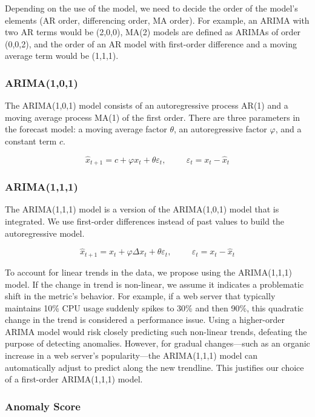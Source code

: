 \documentclass[pdflatex,sn-nature]{sn-jnl}%
\theoremstyle{thmstyleone}%
\theoremstyle{thmstyletwo}%
\theoremstyle{thmstylethree}%
\begin{document}
Depending on the use of the model, we need to decide the order of the model's elements (AR order, differencing order, MA order). For example, an ARIMA with two AR terms would be (2,0,0), MA(2) models are defined as ARIMAs of order (0,0,2), and the order of an AR model with first-order difference and a moving average term would be (1,1,1).

\subsubsection*{ARIMA(1,0,1)}\label{methodology: arima(1,0,1)}

The ARIMA(1,0,1) model consists of an autoregressive process AR(1) and a moving average process MA(1) of the first order. There are three parameters in the forecast model: a moving average factor $\theta$, an autoregressive factor $\varphi$, and a constant term $c$.


\[ \hat{x}_{t+1} = c + \varphi x_t + \theta\varepsilon_t, \hspace{1cm} \varepsilon_t = x_t-\hat{x}_t\]


\subsubsection*{ARIMA(1,1,1)}\label{methodology: arima(1,1,1)}


The ARIMA(1,1,1) model is a version of the ARIMA(1,0,1) model that is integrated. We use first-order differences instead of past values to build the autoregressive model.

\[ \hat{x}_{t+1} = x_t + \varphi\Delta x_t + \theta\varepsilon_t, \hspace{1cm} \varepsilon_t = x_t-\hat{x}_t\]

To account for linear trends in the data, we propose using the ARIMA(1,1,1) model. If the change in trend is non-linear, we assume it indicates a problematic shift in the metric's behavior. For example, if a web server that typically maintains 10\% CPU usage suddenly spikes to 30\% and then 90\%, this quadratic change in the trend is considered a performance issue. Using a higher-order ARIMA model would risk closely predicting such non-linear trends, defeating the purpose of detecting anomalies. However, for gradual changes—such as an organic increase in a web server's popularity—the ARIMA(1,1,1) model can automatically adjust to predict along the new trendline. This justifies our choice of a first-order ARIMA(1,1,1) model.


\subsubsection{Anomaly Score}
\end{document}

